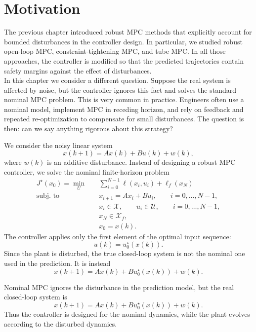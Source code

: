 \section{Motivation}

The previous chapter introduced robust MPC methods that explicitly account for bounded
disturbances in the controller design. In particular, we studied robust open-loop MPC,
constraint-tightening MPC, and tube MPC. In all those approaches, the controller is modified so
that the predicted trajectories contain safety margins against the effect of disturbances.\\

In this chapter we consider a different question. Suppose the real system is affected by noise,
but the controller ignores this fact and solves the standard nominal MPC problem. This is very
common in practice. Engineers often use a nominal model, implement MPC in receding horizon,
and rely on feedback and repeated re-optimization to compensate for small disturbances. The
question is then: can we say anything rigorous about this strategy?

We consider the noisy linear system
\[
    x(k+1)=Ax(k)+Bu(k)+w(k),
\]
where \(w(k)\) is an additive disturbance. Instead of designing a robust MPC controller, we solve
the nominal finite-horizon problem
\[
\begin{aligned}
    J^\star(x_0)
    =
    \min_U\quad
    &
    \sum_{i=0}^{N-1}\ell(x_i,u_i)+\ell_f(x_N)
    \\
    \text{subj. to}\quad
    &
    x_{i+1}=Ax_i+Bu_i,
    \qquad i=0,\ldots,N-1,
    \\
    &
    x_i\in\mathcal X,\qquad u_i\in\mathcal U,
    \qquad i=0,\ldots,N-1,
    \\
    &
    x_N\in\mathcal X_f,
    \\
    &
    x_0=x(k).
\end{aligned}
\]
The controller applies only the first element of the optimal input sequence:
\[
    u(k)=u_0^\star(x(k)).
\]
Since the plant is disturbed, the true closed-loop system is not the nominal one used in the
prediction. It is instead
\[
    x(k+1)=Ax(k)+Bu_0^\star(x(k))+w(k).
\]

\begin{theorembox}
Nominal MPC ignores the disturbance in the prediction model, but the real closed-loop system is
\[
    x(k+1)=Ax(k)+Bu_0^\star(x(k))+w(k).
\]
Thus the controller is designed for the nominal dynamics, while the plant evolves according to
the disturbed dynamics.
\end{theorembox}

